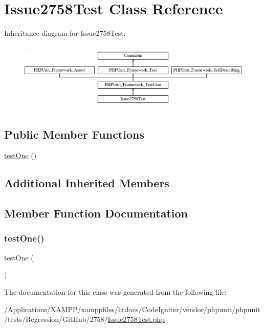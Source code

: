 \hypertarget{class_issue2758_test}{}\section{Issue2758\+Test Class Reference}
\label{class_issue2758_test}
Inheritance diagram for Issue2758\+Test\+:\begin{figure}[H]
\begin{center}
\leavevmode
\includegraphics[height=3.303835cm]{class_issue2758_test}
\end{center}
\end{figure}
\subsection*{Public Member Functions}
\begin{DoxyCompactItemize}
\item 
\mbox{\hyperlink{class_issue2758_test_afbf3ff88b322c6a7197ce02297cd23a0}{test\+One}} ()
\end{DoxyCompactItemize}
\subsection*{Additional Inherited Members}


\subsection{Member Function Documentation}
\mbox{\label{class_issue2758_test_afbf3ff88b322c6a7197ce02297cd23a0}} 
\subsubsection{\texorpdfstring{test\+One()}{testOne()}}
{\footnotesize\ttfamily test\+One (\begin{DoxyParamCaption}{ }\end{DoxyParamCaption})}



The documentation for this class was generated from the following file\+:\begin{DoxyCompactItemize}
\item 
/\+Applications/\+X\+A\+M\+P\+P/xamppfiles/htdocs/\+Code\+Igniter/vendor/phpunit/phpunit/tests/\+Regression/\+Git\+Hub/2758/\mbox{\hyperlink{_issue2758_test_8php}{Issue2758\+Test.\+php}}\end{DoxyCompactItemize}
